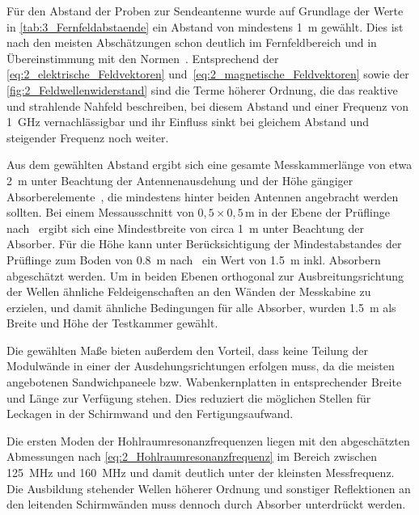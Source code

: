 Für den Abstand der Proben zur Sendeantenne wurde auf Grundlage der Werte in \Tabelle\ref{tab:3_Fernfeldabstaende} ein Abstand von mindestens \SI{1}{\meter} gewählt. Dies ist nach den meisten Abschätzungen schon deutlich im Fernfeldbereich und in Übereinstimmung mit den Normen~\cite{DIN_EN_61000-4-3, VG_95373_15}. Entsprechend der \Gleichungen\eqref{eq:2_elektrische_Feldvektoren} und~\eqref{eq:2_magnetische_Feldvektoren} sowie der \Abb\ref{fig:2_Feldwellenwiderstand} sind die Terme höherer Ordnung, die das reaktive und strahlende Nahfeld beschreiben, bei diesem Abstand und einer Frequenz von \SI{1}{\giga\hertz} vernachlässigbar und ihr Einfluss sinkt bei gleichem Abstand und steigender Frequenz noch weiter. 
\par
\vspace{\linespace}
Aus dem gewählten Abstand ergibt sich eine gesamte Messkammerlänge von etwa \SI{2}{\meter} unter Beachtung der Antennenausdehung und der Höhe gängiger Absorberelemente~\cite{Telemeter_Produktseite, EMV-Support_Produktseite}, die mindestens hinter beiden Antennen angebracht werden sollten. Bei einem Messausschnitt von $0,5 \times 0,5\,\si{\meter}$ in der Ebene der Prüflinge nach~\cite{DIN_EN_61000-4-3} ergibt sich eine Mindestbreite von circa \SI{1}{\meter} unter Beachtung der Absorber. Für die Höhe kann unter Berücksichtigung der Mindestabstandes der Prüflinge zum Boden von \SI{0,8}{\meter} nach~\cite{DIN_EN_61000-4-3, DIN_EN_61000-5-7} ein Wert von \SI{1,5}{\meter} inkl. Absorbern abgeschätzt werden. Um in beiden Ebenen orthogonal zur Ausbreitungsrichtung der Wellen ähnliche Feldeigenschaften an den Wänden der Messkabine zu erzielen, und damit ähnliche Bedingungen für alle Absorber, wurden \SI{1,5}{\meter} als Breite und Höhe der Testkammer gewählt. 
\par
\vspace{\linespace}
Die gewählten Maße bieten außerdem den Vorteil, dass keine Teilung der Modulwände in einer der Ausdehungsrichtungen erfolgen muss, da die meisten angebotenen Sandwichpaneele bzw. Wabenkernplatten in entsprechender Breite und Länge zur Verfügung stehen. Dies reduziert die möglichen Stellen für Leckagen in der Schirmwand und den Fertigungsaufwand.
\par
\vspace{\linespace}
Die ersten Moden der Hohlraumresonanzfrequenzen liegen mit den abgeschätzten Abmessungen nach \Gleichung\eqref{eq:2_Hohlraumresonanzfrequenz} im Bereich zwischen \SI{125}{\mega\hertz} und \SI{160}{\mega\hertz} und damit deutlich unter der kleinsten Messfrequenz. Die Ausbildung stehender Wellen höherer Ordnung und sonstiger Reflektionen an den leitenden Schirmwänden muss dennoch durch Absorber unterdrückt werden.
